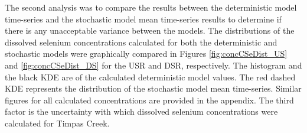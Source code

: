 The second analysis was to compare the results between the deterministic model time-series and the stochastic model mean time-series results to determine if there is any unacceptable variance between the models.  The distributions of the dissolved selenium concentrations calculated for both the deterministic and stochastic models were graphically compared in Figures \ref{fig:concCSeDist_US} and \ref{fig:concCSeDist_DS} for the USR and DSR, respectively.  The histogram and the black KDE are of the calculated deterministic model values.  The red dashed KDE represents the distribution of the stochastic model mean time-series.  Similar figures for all calculated concentrations are provided in the appendix.  The third factor is the uncertainty with which dissolved selenium concentrations were calculated for Timpas Creek.

